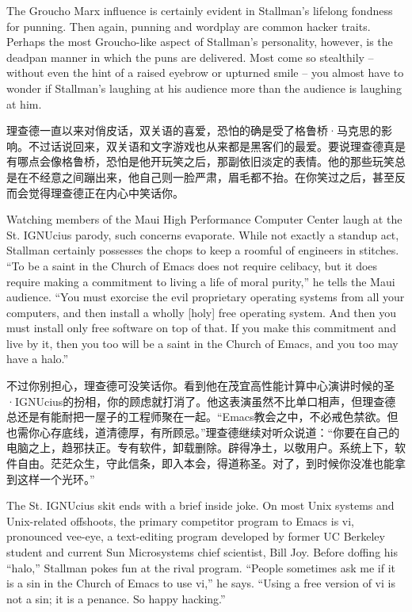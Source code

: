 \ifdefined\eng
The Groucho Marx influence is certainly evident in Stallman's lifelong fondness for punning. Then again, punning and wordplay are common hacker traits. Perhaps the most Groucho-like aspect of Stallman's personality, however, is the deadpan manner in which the puns are delivered. Most come so stealthily -- without even the hint of a raised eyebrow or upturned smile -- you almost have to wonder if Stallman's laughing at his audience more than the audience is laughing at him.
\fi

\ifdefined\chs
理查德一直以来对俏皮话，双关语的喜爱，恐怕的确是受了格鲁桥·马克思的影响。不过话说回来，双关语和文字游戏也从来都是黑客们的最爱。要说理查德真是有哪点会像格鲁桥，恐怕是他开玩笑之后，那副依旧淡定的表情。他的那些玩笑总是在不经意之间蹦出来，他自己则一脸严肃，眉毛都不抬。在你笑过之后，甚至反而会觉得理查德正在内心中笑话你。
\fi

\ifdefined\eng
Watching members of the Maui High Performance Computer Center laugh at the St. IGNUcius parody, such concerns evaporate. While not exactly a standup act, Stallman certainly possesses the chops to keep a roomful of engineers in stitches. ``To be a saint in the Church of Emacs does not require celibacy, but it does require making a commitment to living a life of moral purity,'' he tells the Maui audience. ``You must exorcise the evil proprietary operating systems from all your computers, and then install a wholly [holy] free operating system. And then you must install only free software on top of that. If you make this commitment and live by it, then you too will be a saint in the Church of Emacs, and you too may have a halo.''
\fi

\ifdefined\chs
不过你别担心，理查德可没笑话你。看到他在茂宜高性能计算中心演讲时候的圣·IGNUcius的扮相，你的顾虑就打消了。他这表演虽然不比单口相声，但理查德总还是有能耐把一屋子的工程师聚在一起。``Emacs教会之中，不必戒色禁欲。但也需你心存底线，道清德厚，有所顾忌。''理查德继续对听众说道：``你要在自己的电脑之上，趋邪扶正。专有软件，卸载删除。辟得净土，以敬用户。系统上下，软件自由。茫茫众生，守此信条，即入本会，得道称圣。对了，到时候你没准也能拿到这样一个光环。''
\fi

\ifdefined\eng
The St. IGNUcius skit ends with a brief inside joke. On most Unix systems and Unix-related offshoots, the primary competitor program to Emacs is vi, pronounced vee-eye, a text-editing program developed by former UC Berkeley student and current Sun Microsystems chief scientist, Bill Joy. Before doffing his ``halo,'' Stallman pokes fun at the rival program. ``People sometimes ask me if it is a sin in the Church of Emacs to use vi,'' he says. ``Using a free version of vi is not a sin; it is a penance. So happy hacking.''
\fi

